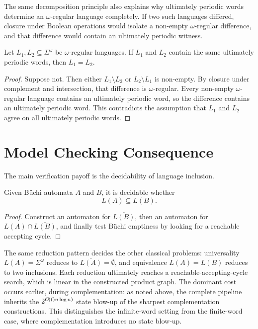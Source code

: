 The same decomposition principle also explains why ultimately periodic
words determine an $\omega$-regular language completely.  If two such
languages differed, closure under Boolean operations would isolate a
non-empty $\omega$-regular difference, and that difference would contain
an ultimately periodic witness.

\begin{proposition}
\label{prop:ultimately-periodic-fingerprint}
Let $L_1,L_2\subseteq\Sigma^\omega$ be $\omega$-regular languages.  If
$L_1$ and $L_2$ contain the same ultimately periodic words, then
$L_1=L_2$.
\end{proposition}

\begin{proof}
Suppose not.  Then either $L_1\setminus L_2$ or $L_2\setminus L_1$ is
non-empty.  By closure under complement and intersection, that
difference is $\omega$-regular.  Every non-empty $\omega$-regular
language contains an ultimately periodic word, so the difference
contains an ultimately periodic word.  This contradicts the assumption
that $L_1$ and $L_2$ agree on all ultimately periodic words.
\end{proof}


\section{Model Checking Consequence}
\label{sec:buchi-model-checking-consequence}

The main verification payoff is the decidability of language inclusion.

\begin{corollary}
\label{cor:buchi-inclusion}
Given B\"uchi automata $A$ and $B$, it is decidable whether
\[
  L(A)\subseteq L(B).
\]
\end{corollary}

\begin{proof}
Construct an automaton for $\overline{L(B)}$, then an automaton for
$L(A)\cap\overline{L(B)}$, and finally test B\"uchi emptiness by looking
for a reachable accepting cycle.
\end{proof}

The same reduction pattern decides the other classical problems:
universality $L(A)=\Sigma^\omega$ reduces to
$\overline{L(A)}=\emptyset$, and equivalence $L(A)=L(B)$ reduces to two
inclusions.  Each reduction ultimately reaches a
reachable-accepting-cycle search, which is linear in the constructed
product graph.  The dominant cost occurs earlier, during
complementation: as noted above, the complete pipeline inherits the
$2^{\mathcal{O}\!\left((\right)n\log n)}$ state blow-up of the sharpest complementation
constructions.  This distinguishes the infinite-word setting from the
finite-word case, where complementation introduces no state blow-up.

